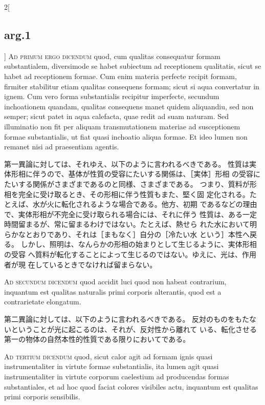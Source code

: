 \documentclass[paper=a4paper,fontsize=10pt,jafontsize=9pt,titlepage]{jlreq}
\begin{document}
\begin{paracol}{2}[\subsection{arg.1}]
{\scshape Ad primum ergo dicendum} quod, cum qualitas
consequatur formam substantialem, diversimode se habet subiectum ad
receptionem qualitatis, sicut se habet ad receptionem formae. Cum enim
materia perfecte recipit formam, firmiter stabilitur etiam qualitas
consequens formam; sicut si aqua convertatur in ignem. Cum vero forma
substantialis recipitur imperfecte, secundum inchoationem quandam,
qualitas consequens manet quidem aliquandiu, sed non semper; sicut patet
in aqua calefacta, quae redit ad suam naturam. Sed illuminatio non fit
per aliquam transmutationem materiae ad susceptionem formae
substantialis, ut fiat quasi inchoatio aliqua formae. Et ideo lumen non
remanet nisi ad praesentiam agentis.

\switchcolumn

第一異論に対しては、それゆえ、以下のように言われるべきである。
性質は実体形相に伴うので、基体が性質の受容にたいする関係は、［実体］形相
 の受容にたいする関係がさまざまであるのと同様、さまざまである。
つまり、質料が形相を完全に受け取るとき、その形相に伴う性質もまた、堅く固
 定化される。たとえば、水が火に転化されるような場合である。他方、初期
 であるなどの理由で、実体形相が不完全に受け取られる場合には、それに伴う
 性質は、ある一定時間留まるが、常に留まるわけではない。たとえば、熱せら
 れた水において明らかなとおりであり、それは［まもなく］自分の［冷たい水
 という］本性へ戻る。
しかし、照明は、なんらかの形相の始まりとして生じるように、実体形相の受容
 へ質料が転化することによって生じるのではない。ゆえに、光は、作用者が現
 在しているときでなければ留まらない。

\switchcolumn*[\subsection{ad.2}]

{\scshape Ad secundum dicendum} quod accidit luci quod
non habeat contrarium, inquantum est qualitas naturalis primi corporis
alterantis, quod est a contrarietate elongatum.

\switchcolumn

第二異論に対しては、以下のように言われるべきである。
反対のものをもたないということが光に起こるのは、それが、反対性から離れて
 いる、転化させる第一の物体の自然本性的性質である限りにおいてである。

\switchcolumn*[\subsection{ad.3}]

{\scshape Ad tertium dicendum} quod, sicut calor agit ad
formam ignis quasi instrumentaliter in virtute formae substantialis, ita
lumen agit quasi instrumentaliter in virtute corporum caelestium ad
producendas formas substantiales, et ad hoc quod faciat colores
visibiles actu, inquantum est qualitas primi corporis sensibilis.


\end{paracol}
\end{document}
